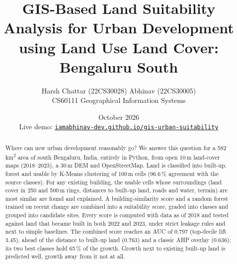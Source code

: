 \documentclass[11pt,a4paper]{article}
\title{GIS-Based Land Suitability Analysis for Urban Development\\
       using Land Use Land Cover: Bengaluru South}
\author{Harsh Chattar (22CS30028) \qquad Abhinav (22CS30005)\\[0.5em]
  \normalsize CS60111 Geographical Information Systems}
\date{October 2026\\[0.8em]
  \small Live demo: \href{https://iamabhinav-dev.github.io/gis-urban-suitability/}{\texttt{iamabhinav-dev.github.io/gis-urban-suitability}}}
\begin{document}
\maketitle

\begin{abstract}
Where can new urban development reasonably go? We answer this question for a
582\,km\textsuperscript{2} area of south Bengaluru, India, entirely in Python, from open
10\,m land-cover maps (2018--2023), a 30\,m DEM and OpenStreetMap. Land is classified into
built-up, forest and usable by K-Means clustering of 100\,m cells (96.6\,\% agreement with the
source classes). For any existing building, the usable cells whose surroundings (land cover in
250 and 500\,m rings, distances to built-up land, roads and water, terrain) are most similar
are found and explained. A building-similarity score and a random forest trained on recent
change are combined into a suitability score, graded into classes and grouped into candidate
sites. Every score is computed with data as of 2018 and tested against land that became built
in both 2022 and 2023, under strict leakage rules and next to simple baselines. The combined score
reaches an AUC of 0.797 (top-decile lift 3.45), ahead of the distance to built-up land (0.763)
and a classic AHP overlay (0.636); its two best classes hold 65\,\% of the growth. Growth next
to existing built-up land is predicted well, growth away from it not at all.
\end{abstract}

\newpage
\tableofcontents
\newpage













\end{document}
